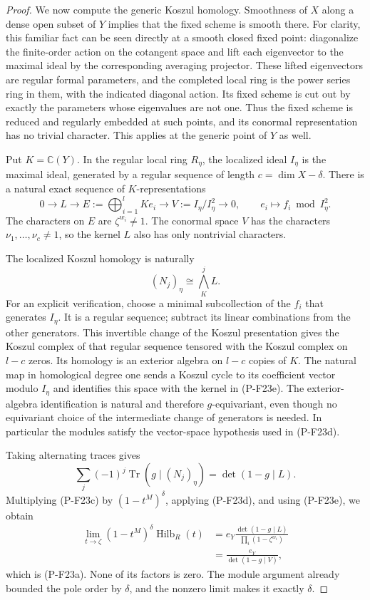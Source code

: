 \begin{proof}
We now compute the generic Koszul homology. Smoothness of
$X$ along a dense open subset of $Y$ implies that the fixed
scheme is smooth there. For clarity, this familiar fact can
be seen directly at a smooth closed fixed point: diagonalize
the finite-order action on the cotangent space and lift each
eigenvector to the maximal ideal by the corresponding averaging
projector. These lifted eigenvectors are regular formal
parameters, and the completed local ring is the power series
ring in them, with the indicated diagonal action. Its fixed
scheme is cut out by exactly the parameters whose eigenvalues
are not one. Thus the fixed scheme is reduced and regularly
embedded at such points, and its conormal representation has
no trivial character. This applies at the generic point of
$Y$ as well.

Put $K=\mathbb C(Y)$. In the regular local ring $R_\eta$,
the localized ideal $I_\eta$ is the maximal ideal, generated
by a regular sequence of length $c=\dim X-\delta$. There
is a natural exact sequence of $K$-representations
\[
 0\longrightarrow L\longrightarrow
 E:=\bigoplus_{i=1}^l K e_i
 \longrightarrow V:=I_\eta/I_\eta^2\longrightarrow0,
 \qquad e_i\longmapsto f_i\bmod I_\eta^2.
 \tag{P-F23e}
\]
The characters on $E$ are $\zeta^{w_i}\ne1$.
The conormal space $V$ has the characters
$\nu_1,\ldots,\nu_c\ne1$, so the kernel $L$ also has
only nontrivial characters.

The localized Koszul homology is naturally
\[
 (N_j)_\eta\cong\bigwedge^j_K L.
 \tag{P-F23f}
\]
For an explicit verification, choose a minimal subcollection of
the $f_i$ that generates $I_\eta$. It is a regular sequence;
subtract its linear combinations from the other generators.
This invertible change of the Koszul presentation gives the
Koszul complex of that regular sequence tensored with the
Koszul complex on $l-c$ zeros. Its homology is an exterior
algebra on $l-c$ copies of $K$. The natural map in homological
degree one sends a Koszul cycle to its coefficient vector modulo
$I_\eta$ and identifies this space with the kernel in
(P-F23e). The exterior-algebra identification is natural and
therefore $g$-equivariant, even though no equivariant choice
of the intermediate change of generators is needed.
In particular the modules satisfy the vector-space hypothesis
used in (P-F23d).

Taking alternating traces gives
\[
 \sum_j(-1)^j\operatorname{Tr}(g\mid (N_j)_\eta)
       =\det(1-g\mid L).
\]
Multiplying (P-F23c) by $(1-t^M)^\delta$, applying
(P-F23d), and using (P-F23e), we obtain
\begin{align*}
 \lim_{t\to\zeta}(1-t^M)^\delta\operatorname{Hilb}_R(t)
 &=e_Y\frac{\det(1-g\mid L)}{
                         \prod_i(1-\zeta^{w_i})}\\
 &=\frac{e_Y}{\det(1-g\mid V)},
\end{align*}
which is (P-F23a). None of its factors is zero. The module
argument already bounded the pole order by $\delta$, and
the nonzero limit makes it exactly $\delta$.


\end{proof}
